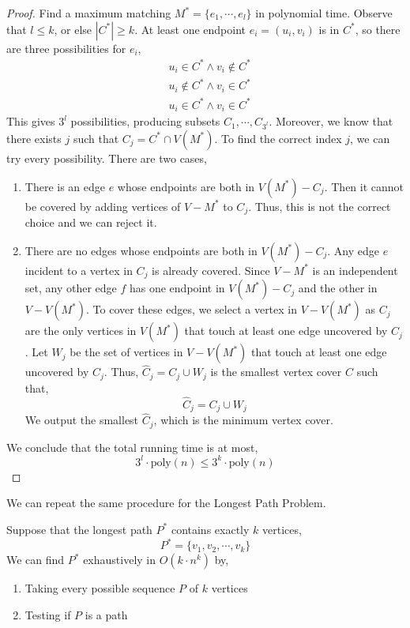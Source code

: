 \begin{proof}
	Find a maximum matching $M^* = \{e_1, \cdots, e_l\}$ in polynomial time. Observe that $l \leq k$, or else $|C^*| \geq k$. At least one endpoint $e_i = (u_i, v_i)$ is in $C^*$, so there are three possibilities for $e_i$,
	\begin{align*}
		&u_{i} \in C^{*} \wedge v_{i} \notin C^{*} \\
		&u_{i} \notin C^{*} \wedge v_{i} \in C^{*} \\
		&u_{i} \in C^{*} \wedge v_{i} \in C^{*}
	\end{align*}
	\noindent This gives $3^l$ possibilities, producing subsets $C_1, \cdots, C_{3^l}$. Moreover, we know that there exists $j$ such that $C_j = C^* \cap V(M^*)$. To find the correct index $j$, we can try every possibility. There are two cases,
	\begin{enumerate}
		\item There is an edge $e$ whose endpoints are both in $V(M^*) - C_j$. Then it cannot be covered by adding vertices of $V - M^*$ to $C_j$. Thus, this is not the correct choice and we can reject it.
		\item There are no edges whose endpoints are both in $V(M^*) - C_j$. Any edge $e$ incident to a vertex in $C_j$ is already covered. Since $V - M^*$ is an independent set, any other edge $f$ has one endpoint in $V(M^*) - C_j$ and the other in $V - V(M^*)$. To cover these edges, we select a vertex in $V - V(M^*)$ as $C_j$ are the only vertices in $V(M^*)$ that touch at least one edge uncovered by $C_j$. Let $W_j$ be the set of vertices in $V - V(M^*)$ that touch at least one edge uncovered by $C_j$. Thus, $\hat{C}_j = C_j \cup W_j$ is the smallest vertex cover $C$ such that,
		\[\hat{C}_j = C_j \cup W_j\]
		\noindent We output the smallest $\hat{C}_j$, which is the minimum vertex cover.
	\end{enumerate}
	We conclude that the total running time is at most,
	\[3^l \cdot \text{poly}(n) \leq 3^k \cdot \text{poly}(n)\]
\end{proof}

We can repeat the same procedure for the Longest Path Problem.

\begin{thm}
	Suppose that the longest path $P^*$ contains exactly $k$ vertices,
	\[P^* = \{v_1, v_2, \cdots, v_k\}\]
	\noindent We can find $P^*$ exhaustively in $O(k \cdot n^k)$ by,
	\begin{enumerate}
		\item Taking every possible sequence $P$ of $k$ vertices
		\item Testing if $P$ is a path
	\end{enumerate}
\end{thm}

